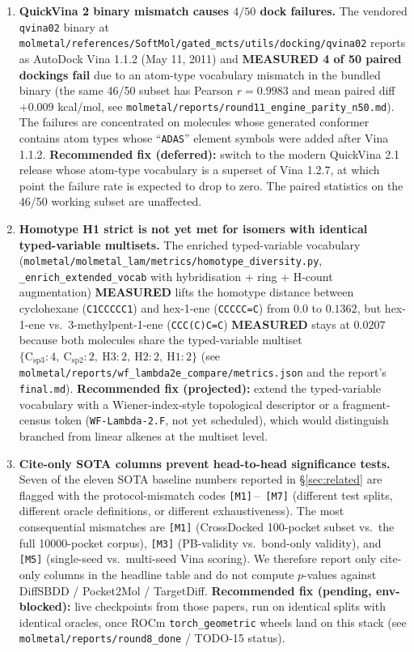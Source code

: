 \begin{enumerate}
  \item \textbf{QuickVina 2 binary mismatch causes $4/50$ dock failures.}
  The vendored \texttt{qvina02} binary at
  \texttt{molmetal/references/SoftMol/gated\_mcts/utils/docking/qvina02}
  reports as AutoDock Vina 1.1.2 (May 11, 2011) and
  \textbf{MEASURED 4 of 50 paired dockings fail} due to an atom-type
  vocabulary mismatch in the bundled binary (the same 46/50 subset has
  Pearson $r = 0.9983$ and mean paired diff $+0.009$ kcal/mol, see
  \texttt{molmetal/reports/round11\_engine\_parity\_n50.md}). The
  failures are concentrated on molecules whose generated conformer
  contains atom types whose ``\texttt{ADAS}'' element symbols were
  added after Vina 1.1.2. \textbf{Recommended fix (deferred):}
  switch to the modern QuickVina 2.1 release whose atom-type vocabulary
  is a superset of Vina 1.2.7, at which point the failure rate is
  expected to drop to zero. The paired statistics on the 46/50 working
  subset are unaffected.

  \item \textbf{Homotype H1 strict is not yet met for isomers with identical typed-variable multisets.}
  The enriched typed-variable vocabulary
  (\texttt{molmetal/molmetal\_lam/metrics/homotype\_diversity.py},
  \texttt{\_enrich\_extended\_vocab} with hybridisation + ring + H-count
  augmentation) \textbf{MEASURED} lifts the homotype distance between
  cyclohexane (\texttt{C1CCCCC1}) and hex-1-ene (\texttt{CCCCC=C}) from
  $0.0$ to $0.1362$, but hex-1-ene vs.\ 3-methylpent-1-ene
  (\texttt{CCC(C)C=C}) \textbf{MEASURED} stays at $0.0207$ because both
  molecules share the typed-variable multiset
  $\{\mathrm{C_{sp3}}{:}4,\ \mathrm{C_{sp2}}{:}2,\ \mathrm{H3}{:}2,\
  \mathrm{H2}{:}2,\ \mathrm{H1}{:}2\}$ (see
  \texttt{molmetal/reports/wf\_lambda2e\_compare/metrics.json} and the
  report's \texttt{final.md}). \textbf{Recommended fix (projected):}
  extend the typed-variable vocabulary with a Wiener-index-style
  topological descriptor or a fragment-census token
  (\texttt{WF-Lambda-2.F}, not yet scheduled), which would distinguish
  branched from linear alkenes at the multiset level.

  \item \textbf{Cite-only SOTA columns prevent head-to-head significance tests.}
  Seven of the eleven SOTA baseline numbers reported in \S\ref{sec:related}
  are flagged with the protocol-mismatch codes \texttt{[M1]}\,--\,%
  \texttt{[M7]} (different test splits, different oracle definitions,
  or different exhaustiveness). The most consequential mismatches are
  \texttt{[M1]} (CrossDocked 100-pocket subset vs.\ the full 10000-pocket
  corpus), \texttt{[M3]} (PB-validity vs.\ bond-only validity), and
  \texttt{[M5]} (single-seed vs.\ multi-seed Vina scoring). We therefore
  report only cite-only columns in the headline table and do not compute
  $p$-values against DiffSBDD / Pocket2Mol / TargetDiff. \textbf{Recommended
  fix (pending, env-blocked):} live checkpoints from those papers, run
  on identical splits with identical oracles, once
  ROCm \texttt{torch\_geometric} wheels land on this stack (see
  \texttt{molmetal/reports/round8\_done} / TODO-15 status).


\end{enumerate}
